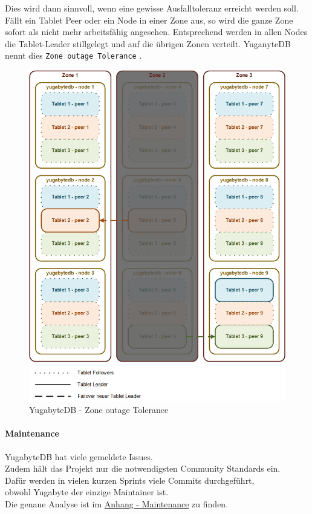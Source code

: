\begin{flushleft}
    Dies wird dann sinnvoll, wenn eine gewisse Ausfalltoleranz erreicht werden soll.
    Fällt ein Tablet Peer oder ein Node in einer Zone aus, so wird die ganze Zone sofort als nicht mehr arbeitsfähig angesehen.
    Entsprechend werden in allen Nodes die Tablet-Leader stillgelegt und auf die übrigen Zonen verteilt.
    YuganyteDB nennt dies \texttt{Zone outage Tolerance} \cite{PTKCP8A4}.
    \begin{figure}[H]
        \centering
        \includegraphics[width=0.8\linewidth]{source/implementation/evaluation/postgresql_ha_solutions/yugabytedb/yugabytedb-zone-outage-tolerance}
        \caption{YugabyteDB - Zone outage Tolerance}
        \label{fig:yugabytedb-zone-outage-tolerance}
    \end{figure}
\end{flushleft}
\begin{flushleft}
    \paragraph{Maintenance}
    YugabyteDB hat viele gemeldete Issues.\\
    Zudem hält das Projekt nur die notwendigsten Community Standards ein.\\
    Dafür werden in vielen kurzen Sprints viele Commits durchgeführt,\\
    obwohl Yugabyte der einzige Maintainer ist.\\
    Die genaue Analyse ist im \hyperref[subsec:maintenance_patroni]{Anhang - Maintenance} zu finden.
\end{flushleft}
